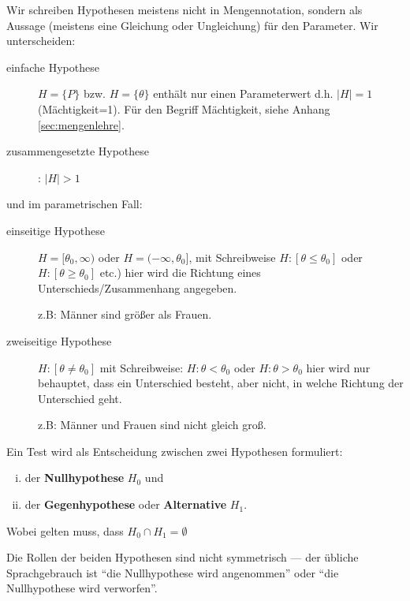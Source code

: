 Wir schreiben Hypothesen meistens nicht in Mengennotation, sondern als
Aussage (meistens eine Gleichung oder Ungleichung) für den Parameter.
Wir unterscheiden:
\begin{description}
    \item[einfache Hypothese] $H=\{P\}$ bzw. $H=\{\theta\}$ enthält nur einen Parameterwert d.h. ${|H|=1}$ (Mächtigkeit=1). Für den Begriff Mächtigkeit, siehe Anhang \ref{sec:mengenlehre}.
    \item[zusammengesetzte Hypothese]: $|H|>1$
    \end{description}
    und im parametrischen Fall:
    \begin{description}
    \item[einseitige Hypothese] $H=[\theta_0,\infty)$ oder $H=(-\infty, \theta_0]$, mit Schreibweise $H:[\theta\leq \theta_0]$ oder $H:[\theta\geq \theta_0]$ etc.) hier wird die Richtung eines Unterschieds/Zusammenhang angegeben.

        z.B: Männer sind größer als Frauen.
    \item[zweiseitige Hypothese] $H:[\theta\neq \theta_0]$ mit Schreibweise: $H:\theta< \theta_0$ oder $H:\theta> \theta_0$ hier wird nur behauptet, dass ein Unterschied besteht, aber nicht, in welche Richtung der Unterschied geht.

        z.B: Männer und Frauen sind nicht gleich groß.
\end{description}

\begin{definition}
Ein Test wird als Entscheidung zwischen zwei Hypothesen formuliert:
    \begin{enumerate}[i)]
        \item der \textbf{Nullhypothese} $H_0$ und 
        \item der \textbf{Gegenhypothese} oder \textbf{Alternative} $H_1$. 
    \end{enumerate}
    Wobei gelten muss, dass $H_0\cap H_1=\emptyset$
\end{definition}
Die Rollen der beiden Hypothesen sind nicht symmetrisch --- der übliche
Sprachgebrauch ist ``die Nullhypothese wird angenommen'' oder
``die Nullhypothese wird verworfen''.

